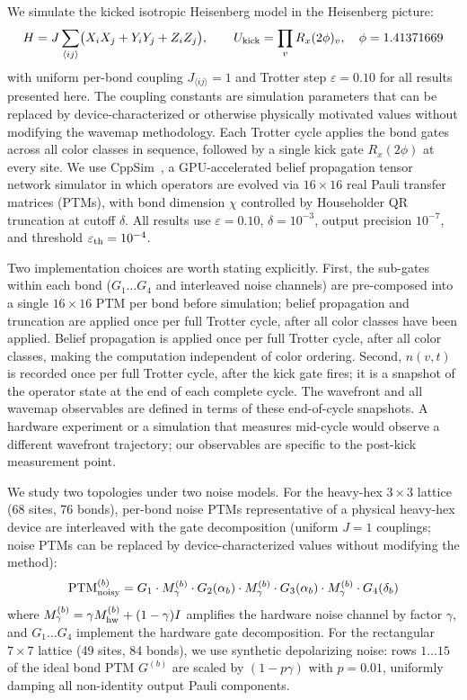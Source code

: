 \documentclass[12pt]{article}
\begin{document}
We simulate the kicked isotropic Heisenberg model in the Heisenberg picture:
\begin{equation}
    H = J \sum_{\langle ij\rangle} \bigl(X_iX_j + Y_iY_j + Z_iZ_j\bigr),
    \qquad
    U_{\rm kick} = \prod_v R_x(2\phi)_v,\quad \phi = 1.41371669
\end{equation}
with uniform per-bond coupling $J_{\langle ij\rangle} = 1$ and Trotter step
$\varepsilon = 0.10$ for all results presented here.
The coupling constants are simulation parameters that can be replaced by
device-characterized or otherwise physically motivated values without
modifying the wavemap methodology.
Each Trotter cycle applies the bond gates across all color classes in sequence,
followed by a single kick gate $R_x(2\phi)$ at every site.
We use CppSim~\cite{dalberto2026cppsim}, a GPU-accelerated belief propagation
tensor network simulator in which operators are evolved via $16\times16$ real
Pauli transfer matrices (PTMs), with bond dimension $\chi$ controlled by
Householder QR truncation at cutoff $\delta$.
All results use $\varepsilon=0.10$, $\delta=10^{-3}$, output precision $10^{-7}$,
and threshold $\varepsilon_{\rm th}=10^{-4}$.

Two implementation choices are worth stating explicitly.
First, the sub-gates within each bond ($G_1\ldots G_4$ and interleaved noise
channels) are pre-composed into a single $16\times16$ PTM per bond before
simulation; belief propagation and truncation are applied once per full Trotter
cycle, after all color classes have been applied.
Belief propagation is applied once per full Trotter cycle, after all color
classes, making the computation independent of color ordering.
Second, $n(v,t)$ is recorded once per full Trotter cycle, after the kick gate
fires; it is a snapshot of the operator state at the end of each complete cycle.
The wavefront and all wavemap observables are defined in terms of these
end-of-cycle snapshots.
A hardware experiment or a simulation that measures mid-cycle would observe
a different wavefront trajectory; our observables are specific to the
post-kick measurement point.

We study two topologies under two noise models.
For the heavy-hex $3\times3$ lattice (68 sites, 76 bonds), per-bond
noise PTMs representative of a physical heavy-hex device are interleaved
with the gate decomposition (uniform $J=1$ couplings; noise PTMs can be
replaced by device-characterized values without modifying the method):
\begin{equation}
    \mathrm{PTM}_{\rm noisy}^{(b)} =
    G_1 \cdot M_\gamma^{(b)} \cdot G_2(\alpha_b) \cdot M_\gamma^{(b)}
    \cdot G_3(\alpha_b) \cdot M_\gamma^{(b)} \cdot G_4(\delta_b)
    \label{eq:noisy_ptm}
\end{equation}
where $M_\gamma^{(b)} = \gamma M_{\rm hw}^{(b)} + (1-\gamma)I$ amplifies
the hardware noise channel by factor $\gamma$, and $G_1\ldots G_4$ implement
the hardware gate decomposition.
For the rectangular $7\times7$ lattice (49 sites, 84 bonds), we use synthetic
depolarizing noise: rows $1\ldots15$ of the ideal bond PTM $G^{(b)}$ are
scaled by $(1-p\gamma)$ with $p=0.01$, uniformly damping all non-identity
output Pauli components.
\end{document}
